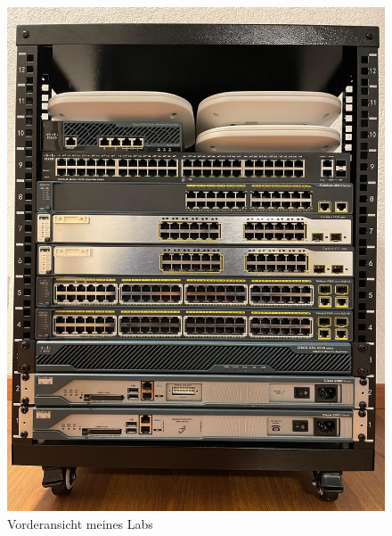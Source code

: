 \documentclass[11pt, a4paper]{awesome-cv}
\begin{document}
\begin{cvletter}
\begin{figure}[h!]
    \centering
    \begin{minipage}{0.48\textwidth} %
        \centering
        \includegraphics[width=\textwidth]{./foto_lab/lab_1.jpg}
        \caption{Vorderansicht meines Labs}
        \label{fig:lab1}
    \end{minipage}
    \hfill
    \begin{minipage}{0.48\textwidth} %
        \centering

\end{minipage}
\end{figure}
\end{cvletter}
\end{document}
